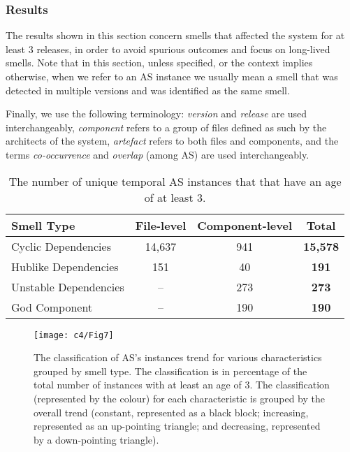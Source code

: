 \subsubsection{Results}\label{c4:sec:results-rq1.1}
The results shown in this section concern smells that affected the system for at least 3 releases, in order to avoid spurious outcomes and focus on long-lived smells. Note that in this section, unless specified, or the context implies otherwise, when we refer to an AS instance we usually mean a smell that was detected in multiple versions and was identified as the same smell.

Finally, we use the following terminology: \emph{version} and \emph{release} are used interchangeably, \emph{component} refers to a group of files defined as such by the architects of the system, \emph{artefact} refers to both files and components, and the terms \emph{co-occurrence} and \emph{overlap} (among AS) are used interchangeably.

\begin{table}[tbp]
    \centering
    \caption{The number of unique temporal AS instances that that have an age of at least 3.}
    \label{c4:tab:smell-count}
    \begin{tabular}{@{}lcc|c@{}}
    \toprule
    \textbf{Smell Type} & \textbf{File-level} & \textbf{Component-level} & \textbf{Total} \\ \midrule
    Cyclic Dependencies & 14,637 & 941 & \textbf{15,578} \\
    Hublike Dependencies & 151 & 40 & \textbf{191} \\
    Unstable Dependencies & -- & 273 & \textbf{273} \\
    God Component & -- & 190 & \textbf{190} \\ \bottomrule
    \end{tabular}
\end{table}

\begin{figure}[h]
    \centering
    \texttt{[image: c4/Fig7]}
    \caption{The classification of AS's instances trend for various characteristics grouped by smell type. The classification is in percentage of the total number of instances with at least an age of 3. The classification (represented by the colour) for each characteristic is grouped by the overall trend (constant, represented as a black block; increasing, represented as an up-pointing triangle; and decreasing, represented by a down-pointing triangle).}\label{c4:fig:dtw-classification}
\end{figure}

